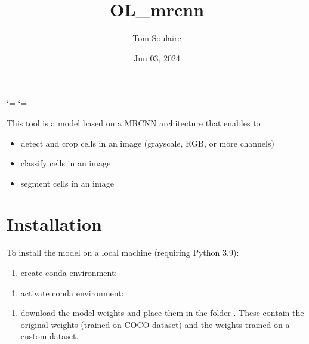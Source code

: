 \documentclass[letterpaper,10pt,english]{sphinxmanual}
\title{OL\_mrcnn}
\date{Jun 03, 2024}
\author{Tom Soulaire}
\begin{document}
\ifdefined\shorthandoff
  \ifnum\catcode`\=\string=\active\shorthandoff{=}\fi
  \ifnum\catcode`\"=\active{}\fi
\fi

\pagestyle{empty}
\sphinxmaketitle
\pagestyle{plain}
\sphinxtableofcontents
\pagestyle{normal}
\label{\detokenize{index::doc}}


\sphinxAtStartPar
This tool is a model based on a MRCNN architecture that enables to
\begin{itemize}
\item {} 
\sphinxAtStartPar
detect and crop cells in an image (grayscale, RGB, or more channels)

\item {} 
\sphinxAtStartPar
classify cells in an image

\item {} 
\sphinxAtStartPar
segment cells in an image

\end{itemize}


\chapter{Installation}
\label{\detokenize{index:installation}}
\sphinxAtStartPar
To install the model on a local machine (requiring Python 3.9):
\begin{enumerate}
%
\item {} 
\sphinxAtStartPar
create conda environment:

\end{enumerate}

\begin{sphinxVerbatim}[commandchars=\\\{\}]
    
\end{sphinxVerbatim}
\begin{enumerate}
%
\setcounter{enumi}{1}
\item {} 
\sphinxAtStartPar
activate conda environment:

\end{enumerate}

\begin{sphinxVerbatim}[commandchars=\\\{\}]
  
\end{sphinxVerbatim}
\begin{enumerate}
%
\setcounter{enumi}{2}
\item {} 
\sphinxAtStartPar
download the model weights  and place them in the folder . These contain the original weights (trained on COCO dataset) and the weights trained on a custom dataset.

\end{enumerate}
\end{document}
